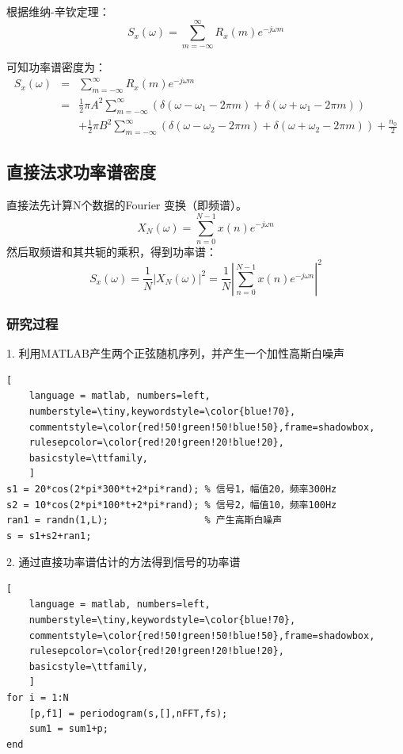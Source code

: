 \documentclass[UTF-8, a4paper, 12pt]{ctexart}
\begin{document}
根据维纳-辛钦定理：
\begin{equation}
        S_x(\omega)=\sum_{m=-\infty}^{\infty}R_x(m)e^{-j\omega m}
\end{equation}

可知功率谱密度为：
\begin{equation}
    \begin{array}{rcl}
        S_x(\omega)&=&\sum_{m=-\infty}^{\infty}R_x(m)e^{-j\omega m}\\
        &=&\frac{1}{2}\pi A^2\sum^{\infty}_{m=-\infty}(\delta(\omega-\omega_1-2\pi m)+\delta(\omega+\omega_1-2\pi m))\\
        &&+\frac{1}{2}\pi B^2\sum^{\infty}_{m=-\infty}(\delta(\omega-\omega_2-2\pi m)+\delta(\omega+\omega_2-2\pi m))+\frac{n_0}{2}
    \end{array}
\end{equation}
\subsection{直接法求功率谱密度}

直接法先计算N个数据的Fourier 变换（即频谱）。
\begin{equation}
    X_N(\omega)=\sum_{n=0}^{N-1}x(n)e^{-j\omega n}
\end{equation}
然后取频谱和其共轭的乘积，得到功率谱：
\begin{equation}
    S_x(\omega)=\frac{1}{N}\left\lvert X_N(\omega)\right\rvert ^2=\frac{1}{N}\left\lvert \sum_{n=0}^{N-1}x(n)e^{-j\omega n}\right\rvert^2 
\end{equation}
\subsubsection{研究过程}
1. 利用MATLAB产生两个正弦随机序列，并产生一个加性高斯白噪声
\begin{lstlisting}[
	language = matlab, numbers=left, 
	numberstyle=\tiny,keywordstyle=\color{blue!70},
	commentstyle=\color{red!50!green!50!blue!50},frame=shadowbox,
	rulesepcolor=\color{red!20!green!20!blue!20},
	basicstyle=\ttfamily,
	]
s1 = 20*cos(2*pi*300*t+2*pi*rand); % 信号1，幅值20，频率300Hz
s2 = 10*cos(2*pi*100*t+2*pi*rand); % 信号2，幅值10，频率100Hz
ran1 = randn(1,L);                 % 产生高斯白噪声
s = s1+s2+ran1;
\end{lstlisting}

2. 通过直接功率谱估计的方法得到信号的功率谱
\begin{lstlisting}[
	language = matlab, numbers=left, 
	numberstyle=\tiny,keywordstyle=\color{blue!70},
	commentstyle=\color{red!50!green!50!blue!50},frame=shadowbox,
	rulesepcolor=\color{red!20!green!20!blue!20},
	basicstyle=\ttfamily,
	]
for i = 1:N
    [p,f1] = periodogram(s,[],nFFT,fs);
    sum1 = sum1+p;  
end
\end{lstlisting}
\end{document}
